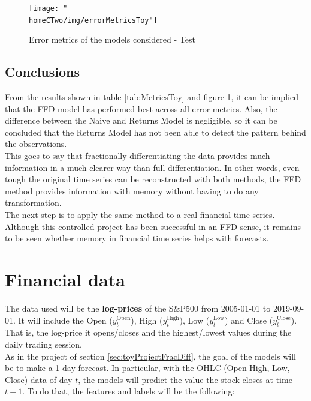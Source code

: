 \documentclass[a4paper]{article}
\newcommand{\homeCTwo}{../../Chapter 2 - FracDiff/Draft}
\begin{document}
\begin{figure}[htbp]
\centering
	\texttt{[image: "\\homeCTwo/img/errorMetricsToy"]}
	\caption{Error metrics of the models considered - Test}
	\label{fig:MetricsToy}
\end{figure}

\subsection{Conclusions}
From the results shown in table \ref{tab:MetricsToy} and figure 
\ref{fig:MetricsToy}, it can be implied that the FFD model has performed 
best across all error metrics. Also, the difference between the Naive and 
Returns Model is negligible, so it can be concluded that the Returns Model 
has not been able to detect the pattern behind the observations.\\

This goes to say that fractionally differentiating the data provides much 
information in a much clearer way than full differentiation. In other words, 
even tough the original time series can be reconstructed with both methods, 
the FFD method provides information with memory without having to do any 
transformation.\\

The next step is to apply the same method to a real financial time series. 
Although this controlled project has been successful in an FFD sense, it 
remains to be seen whether memory in financial time series helps with 
forecasts.

\section{Financial data}
\label{sec:fracDiffFinData}
The data used will be the \textbf{log-prices} of the S\&P500 from 2005-01-01 
to 2019-09-01. It will include the Open ($y_t^{\text{Open}}$), High 
($y_t^{\text{High}}$), Low ($y_t^{\text{Low}}$) and Close 
($y_t^{\text{Close}}$). That is, the log-price it opens/closes and the 
highest/lowest values during the daily trading session.\\

As in the project of section \ref{sec:toyProjectFracDiff}, the goal of the 
models will be to make a 1-day forecast. In particular, with the OHLC (Open 
High, Low, Close) data of day $t$, the models will predict the value the 
stock closes at time $t + 1$. To do that, the features and labels 
will be the following:
\end{document}
